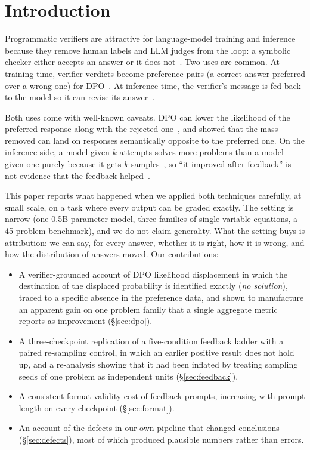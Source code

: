 \documentclass[10pt]{article}
\newcommand{\nosol}{\emph{no solution}}
\begin{document}
\section{Introduction}

Programmatic verifiers are attractive for language-model training and inference
because they remove human labels and LLM judges from the loop: a symbolic checker
either accepts an answer or it does not~\citep{cobbe2021gsm8k,lightman2024verify}. Two
uses are common. At training time, verifier verdicts become preference pairs
(a correct answer preferred over a wrong one) for DPO~\citep{rafailov2023dpo}. At
inference time, the verifier's message is fed back to the model so it can revise its
answer~\citep{madaan2023selfrefine,shinn2023reflexion,gou2024critic}.

Both uses come with well-known caveats. DPO can lower the likelihood of the
preferred response along with the rejected one~\citep{pal2024smaug,feng2024limitations},
and \citet{razin2025displacement} showed that the mass removed can land on responses
semantically opposite to the preferred one. On the inference side, a model given $k$
attempts solves more problems than a model given one purely because it gets $k$
samples~\citep{chen2021codex,brown2024monkeys}, so ``it improved after feedback'' is
not evidence that the feedback helped~\citep{huang2024cannot,kamoi2024survey}.

This paper reports what happened when we applied both techniques carefully, at small
scale, on a task where every output can be graded exactly. The setting is narrow (one
0.5B-parameter model, three families of single-variable equations, a 45-problem
benchmark), and we do not claim generality. What the setting buys is attribution: we
can say, for every answer, whether it is right, how it is wrong, and how the
distribution of answers moved. Our contributions:

\begin{itemize}
  \item A verifier-grounded account of DPO likelihood displacement in which the
  destination of the displaced probability is identified exactly (\nosol{}), traced to a
  specific absence in the preference data, and shown to manufacture an apparent gain
  on one problem family that a single aggregate metric reports as improvement
  (\S\ref{sec:dpo}).
  \item A three-checkpoint replication of a five-condition feedback ladder with a
  paired re-sampling control, in which an earlier positive result does not hold up,
  and a re-analysis showing that it had been inflated by treating sampling seeds of
  one problem as independent units (\S\ref{sec:feedback}).
  \item A consistent format-validity cost of feedback prompts, increasing with
  prompt length on every checkpoint (\S\ref{sec:format}).
  \item An account of the defects in our own pipeline that changed conclusions
  (\S\ref{sec:defects}), most of which produced plausible numbers rather than errors.
\end{itemize}
\end{document}
